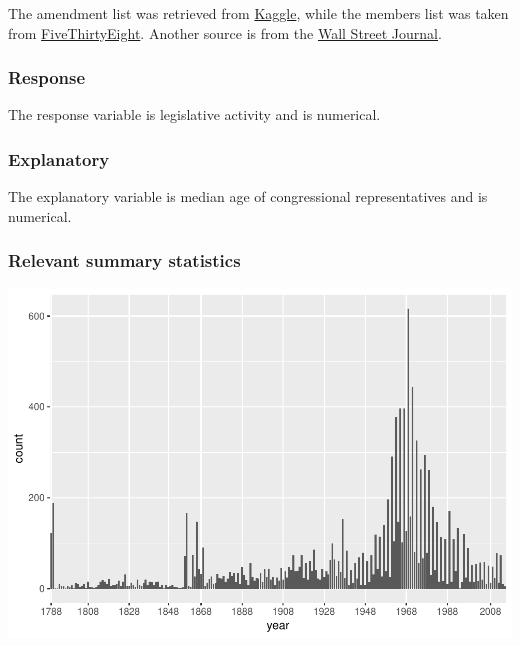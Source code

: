 \documentclass[]{article}
\newenvironment{Shaded}{\begin{snugshade}}{\end{snugshade}}
\newcommand{\KeywordTok}[1]{\textcolor[rgb]{0.13,0.29,0.53}{\textbf{#1}}}
\newcommand{\DataTypeTok}[1]{\textcolor[rgb]{0.13,0.29,0.53}{#1}}
\newcommand{\DecValTok}[1]{\textcolor[rgb]{0.00,0.00,0.81}{#1}}
\newcommand{\StringTok}[1]{\textcolor[rgb]{0.31,0.60,0.02}{#1}}
\newcommand{\OperatorTok}[1]{\textcolor[rgb]{0.81,0.36,0.00}{\textbf{#1}}}
\newcommand{\NormalTok}[1]{#1}
\begin{document}
The amendment list was retrieved from
\href{https://www.kaggle.com/national-archives/amending-america/data}{Kaggle},
while the members list was taken from
\href{https://github.com/fivethirtyeight/data/tree/master/congress-age}{FiveThirtyEight}.
Another source is from the
\href{http://online.wsj.com/public/resources/documents/info-CONGRESS_AGES_1009.html}{Wall
Street Journal}.

\subsubsection{Response}\label{response}

The response variable is legislative activity and is numerical.

\subsubsection{Explanatory}\label{explanatory}

The explanatory variable is median age of congressional representatives
and is numerical.

\subsubsection{Relevant summary
statistics}\label{relevant-summary-statistics}

\begin{Shaded}
\end{Shaded}

\includegraphics{DATA_606_Project_Proposal_files/figure-latex/unnamed-chunk-1-1.pdf}
\end{document}

